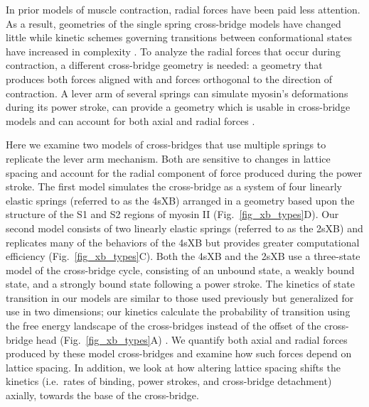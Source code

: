 \documentclass[]{article}
\begin{document}
In prior models of muscle contraction, radial forces have been paid less attention. 
As a result, geometries of the single spring cross-bridge models have changed little while kinetic schemes governing transitions between conformational states have increased in complexity \citep{Huxley1977, Pate1989, Daniel1998, Gordon2001, Mijalovich2009}. %
To analyze the radial forces that occur during contraction, a different cross-bridge geometry is needed: a geometry that produces both forces aligned with and forces orthogonal to the direction of contraction. 
A lever arm of several springs can simulate myosin's deformations during its power stroke, can provide a geometry which is usable in cross-bridge models and can account for both axial and radial forces \citep{Houdusse2001}. 

Here we examine two models of cross-bridges that use multiple springs to replicate the lever arm mechanism.  
Both are sensitive to changes in lattice spacing and account for the radial component of force produced during the power stroke. 
The first model simulates the cross-bridge as a system of four linearly elastic springs (referred to as the 4sXB) arranged in a geometry based upon the structure of the S1 and S2 regions of myosin II (Fig.~\ref{fig_xb_types}D). 
Our second model consists of two linearly elastic springs (referred to as the 2sXB) and replicates many of the behaviors of the 4sXB but provides greater computational efficiency (Fig.~\ref{fig_xb_types}C). 
Both the 4sXB and the 2sXB use a three-state model of the cross-bridge cycle, consisting of an unbound state, a weakly bound state, and a strongly bound state following a power stroke. 
The kinetics of state transition in our models are similar to those used previously but generalized for use in two dimensions; our kinetics calculate the probability of transition using the free energy landscape of the cross-bridges instead of the offset of the cross-bridge head (Fig.~\ref{fig_xb_types}A) \citep{Pate1989, Daniel1998, Tanner2007}.
We quantify both axial and radial forces produced by these model cross-bridges and examine how such forces depend on lattice spacing.
In addition, we look at how altering lattice spacing shifts the kinetics (i.e.\ rates of binding, power strokes, and cross-bridge detachment) axially, towards the base of the cross-bridge. 
\end{document}
